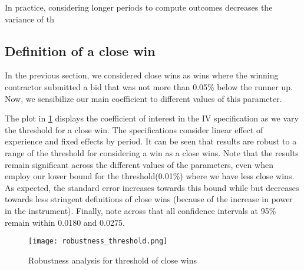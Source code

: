 In practice, considering longer periods to compute outcomes decreases the variance of th







\subsection{Definition of a close win}
In the previous section, we considered close wins as wins where the winning contractor submitted a bid that was not more than 0.05\% below the runner up. Now, we sensibilize our main coefficient to different values of this parameter.

 The plot in  \ref{fig:close_wins_robust} displays the coefficient of interest in the IV specification as we vary the threshold for a close win. The specifications consider linear effect of experience and fixed effects by period. It can be seen that results are robust to a range of the threshold for considering a win as a close wins. Note that the results remain significant across the different values of the parameters, even when  employ our lower bound for the threshold(0.01\%) where we have less close wins. As expected, the standard error increases towards this bound while but decreases towards  less stringent definitions of close wins (because of the increase in power in the instrument). Finally, note across that all confidence intervals at 95\% remain within 0.0180 and 0.0275.

 \begin{figure}[H]
         \centering
         \texttt{[image: robustness\_threshold.png]}
         \caption{Robustness analysis for threshold of close wins}
         \label{fig:close_wins_robust}
     \end{figure}

